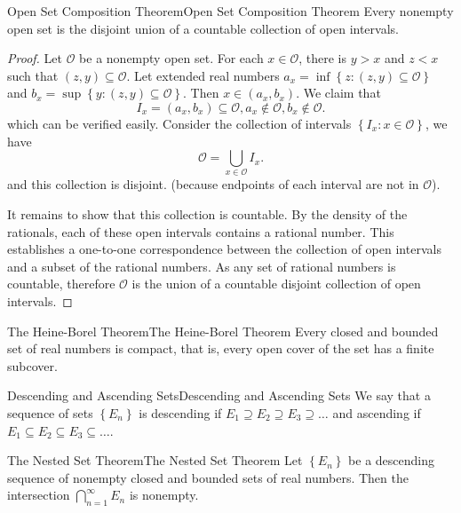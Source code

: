 \documentclass[../main.tex]{subfiles}
\begin{document}
\begin{proposition}{Open Set Composition Theorem}{Open Set Composition Theorem}
	Every nonempty open set is the disjoint union of a countable collection of open intervals.
\end{proposition}
\begin{proof}
	Let $\mathcal{O}$ be a nonempty open set. For each $x\in \mathcal{O}$, there is $y > x$ and $z < x$ such that $(z,y) \subseteq \mathcal{O}$. Let extended real numbers $a_x = \inf \left\{ z:(z,y) \subseteq \mathcal{O} \right\}$ and $b_x = \sup \left\{ y:(z,y) \subseteq \mathcal{O} \right\}$. Then $x \in (a_x,b_x)$. We claim that
	\begin{equation*}
		I_x = (a_x,b_x) \subseteq \mathcal{O}, a_x \notin \mathcal{O}, b_x \notin \mathcal{O}.
	\end{equation*}
	which can be verified easily. Consider the collection of intervals $\left\{ I_x:x\in \mathcal{O} \right\}$, we have
	\begin{equation*}
		\mathcal{O} = \bigcup_{x\in \mathcal{O}} I_x.
	\end{equation*}
	and this collection is disjoint. (because endpoints of each interval are not in $\mathcal{O}$).

	It remains to show that this collection is countable. By the density of the rationals, each of these open intervals contains a rational number. This establishes a one-to-one correspondence between the collection of open intervals and a subset of the rational numbers. As any set of rational numbers is countable, therefore $\mathcal{O}$ is the union of a countable disjoint collection of open intervals.
\end{proof}

\begin{theorem}{The Heine-Borel Theorem}{The Heine-Borel Theorem}
	Every closed and bounded set of real numbers is compact, that is, every open cover of the set has a finite subcover.
\end{theorem}

\begin{definition}{Descending and Ascending Sets}{Descending and Ascending Sets}
	We say that a sequence of sets $\left\{ E_n \right\}$ is descending if $E_1 \supseteq E_2 \supseteq E_3 \supseteq \ldots $ and ascending if $E_1 \subseteq E_2 \subseteq E_3 \subseteq \ldots $.
\end{definition}

\begin{theorem}{The Nested Set Theorem}{The Nested Set Theorem}
	Let $\left\{ E_n \right\}$ be a descending sequence of nonempty closed and bounded sets of real numbers. Then the intersection $\bigcap_{n=1}^{\infty} E_n$ is nonempty.
\end{theorem}
\end{document}
